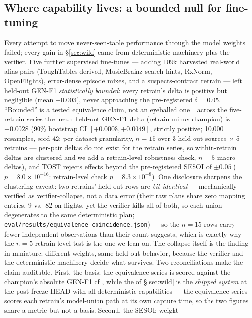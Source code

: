 \documentclass[11pt]{article}
\begin{document}
\subsection{Where capability lives: a bounded null for fine-tuning}
\label{sec:negative}
Every attempt to move never-seen-table performance through the model weights failed;
every gain in \S\ref{sec:wild} came from deterministic machinery plus the verifier.
Five further supervised fine-tunes --- adding 109k harvested real-world alias pairs
(ToughTables-derived, MusicBrainz search hints, RxNorm, OpenFlights), error-dense
episode mixes, and a suspects-contract retrain --- left held-out GEN-F1
\emph{statistically bounded}: every retrain's delta is positive but negligible (mean
$+0.003$), never approaching the pre-registered $\delta{=}0.05$. ``Bounded'' is a
tested equivalence claim, not an eyeballed one~\cite{lakens}: across the five-retrain
series the mean held-out GEN-F1 delta (retrain minus champion) is $+0.0028$
(90\% bootstrap CI $[+0.0008, +0.0049]$, strictly positive;
10{,}000 resamples, seed 42; per-dataset granularity, $n{=}15$ over 3 held-out
sources $\times$ 5 retrains --- per-pair deltas do not exist for the retrain
series, so within-retrain deltas are clustered and we add a retrain-level
robustness check, $n{=}5$ macro deltas), and TOST rejects effects beyond the
pre-registered SESOI of $\pm 0.05$ ($p = 8.0\times10^{-16}$; retrain-level check
$p = 8.3\times10^{-8}$). One disclosure sharpens the clustering caveat: two
retrains' held-out rows are \emph{bit-identical} --- mechanically verified as
verifier-collapse, not a data error (their raw plans share zero mapping entries,
9 vs.\ 82 on flights, yet the verifier kills all of both, so each union
degenerates to the same deterministic plan;
\texttt{eval/results/equivalence\_coincidence.json}) --- so the $n{=}15$ rows
carry fewer independent observations than their count suggests, which is exactly
why the $n{=}5$ retrain-level test is the one we lean on. The collapse itself is
the finding in miniature: different weights, same held-out behavior, because the
verifier and the deterministic machinery decide what survives. Two reconciliations make the claim auditable. First, the
basis: the equivalence series is scored against the champion's absolute GEN-F1 of
\genChampionBasis{}, while the \genFTwo{} of \S\ref{sec:wild} is the \emph{shipped
system} at the post-freeze HEAD with all deterministic capabilities --- the
equivalence series scores each retrain's model-union path at its own capture time,
so the two figures share a metric but not a basis. Second, the SESOI: weight
\end{document}
